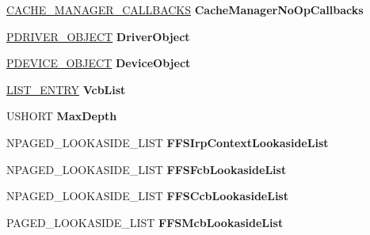 \begin{DoxyCompactItemize}
\hyperlink{struct___c_a_c_h_e___m_a_n_a_g_e_r___c_a_l_l_b_a_c_k_s}{C\+A\+C\+H\+E\+\_\+\+M\+A\+N\+A\+G\+E\+R\+\_\+\+C\+A\+L\+L\+B\+A\+C\+KS} {\bfseries Cache\+Manager\+No\+Op\+Callbacks}
\item 
\mbox{\label{struct___f_f_s___g_l_o_b_a_l_ac51798bb82cdf45932607f8186ea2bdd}} 
\hyperlink{struct___d_r_i_v_e_r___o_b_j_e_c_t}{P\+D\+R\+I\+V\+E\+R\+\_\+\+O\+B\+J\+E\+CT} {\bfseries Driver\+Object}
\item 
\mbox{\label{struct___f_f_s___g_l_o_b_a_l_ae8af59d7ce55abc3001ffbe1fedd89e1}} 
\hyperlink{struct___d_e_v_i_c_e___o_b_j_e_c_t}{P\+D\+E\+V\+I\+C\+E\+\_\+\+O\+B\+J\+E\+CT} {\bfseries Device\+Object}
\item 
\mbox{\label{struct___f_f_s___g_l_o_b_a_l_a1fa6b7473cc672beb2985cc9e1790647}} 
\hyperlink{struct___l_i_s_t___e_n_t_r_y}{L\+I\+S\+T\+\_\+\+E\+N\+T\+RY} {\bfseries Vcb\+List}
\item 
\mbox{\label{struct___f_f_s___g_l_o_b_a_l_a92ed4ce9d92a0aae14d05c2b8db94d94}} 
U\+S\+H\+O\+RT {\bfseries Max\+Depth}
\item 
\mbox{\label{struct___f_f_s___g_l_o_b_a_l_aa8b797ef2d305644fc7a836ac8858905}} 
N\+P\+A\+G\+E\+D\+\_\+\+L\+O\+O\+K\+A\+S\+I\+D\+E\+\_\+\+L\+I\+ST {\bfseries F\+F\+S\+Irp\+Context\+Lookaside\+List}
\item 
\mbox{\label{struct___f_f_s___g_l_o_b_a_l_a0f28f4221b6bd3cfe7928f53f444ee99}} 
N\+P\+A\+G\+E\+D\+\_\+\+L\+O\+O\+K\+A\+S\+I\+D\+E\+\_\+\+L\+I\+ST {\bfseries F\+F\+S\+Fcb\+Lookaside\+List}
\item 
\mbox{\label{struct___f_f_s___g_l_o_b_a_l_a5bcae8acc88cb0162574c290421d9699}} 
N\+P\+A\+G\+E\+D\+\_\+\+L\+O\+O\+K\+A\+S\+I\+D\+E\+\_\+\+L\+I\+ST {\bfseries F\+F\+S\+Ccb\+Lookaside\+List}
\item 
\mbox{\label{struct___f_f_s___g_l_o_b_a_l_abb32bb16334551160926e9eb74ca6127}} 
P\+A\+G\+E\+D\+\_\+\+L\+O\+O\+K\+A\+S\+I\+D\+E\+\_\+\+L\+I\+ST {\bfseries F\+F\+S\+Mcb\+Lookaside\+List}

\end{DoxyCompactItemize}
